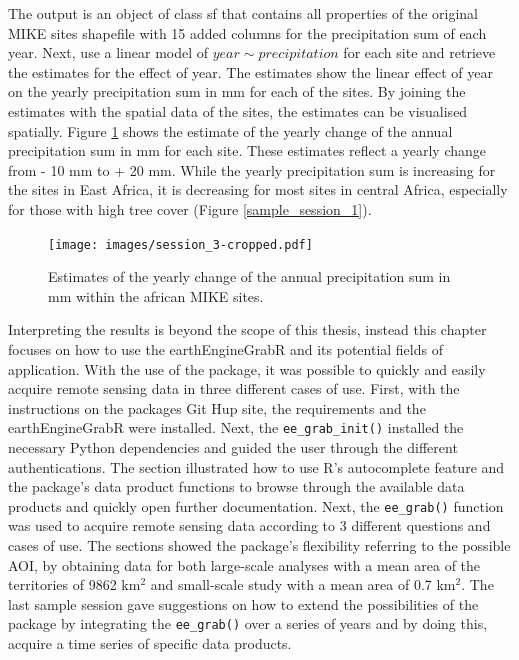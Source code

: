 The output is an object of class sf that contains all properties of the original MIKE sites shapefile with 15 added columns for the precipitation sum of each year.
Next, use a linear model of $year  \sim precipitation$ for each site and retrieve the estimates for the effect of year. 
The estimates show the linear effect of year on the yearly precipitation sum in mm for each of the sites. 
By joining the estimates with the spatial data of the sites, the estimates can be visualised spatially. 
Figure \ref{change} shows the estimate of the yearly change of the annual precipitation sum in mm for each site. These estimates reflect a yearly change from - 10 mm to + 20 mm. While the yearly precipitation sum is increasing for the sites in East Africa, it is decreasing for most sites in central Africa, especially for those with high tree cover (Figure \ref*{sample_session_1}).

\begin{center}
	\begin{figure}[h]
		\begin{center}
			\texttt{[image: images/session\_3-cropped.pdf]}
			\caption{Estimates of the yearly change of the annual precipitation sum in mm within the african MIKE sites.}
			\label{change}
		\end{center}
	\end{figure}
\end{center}



Interpreting the results is beyond the scope of this thesis, instead this chapter focuses on how to use the earthEngineGrabR and its potential fields of application.
With the use of the package, it was possible to quickly and easily acquire remote sensing data in three different cases of use. First, with the instructions on the packages Git Hup site, the requirements and the earthEngineGrabR were installed. Next, the \texttt{ee\_grab\_init()} installed the necessary Python dependencies and guided the user through the different authentications. The section illustrated how to use R's autocomplete feature and the package's data product functions to browse through the available data products and quickly open further documentation. Next, the \texttt{ee\_grab()} function was used to acquire remote sensing data according to 3 different questions and cases of use. The sections showed the package's flexibility referring to the possible AOI, by obtaining data for both large-scale analyses with a mean area of the territories of 9862 km$^2$ and small-scale study with a mean area of 0.7 km$^2$.
The last sample session gave suggestions on how to extend the possibilities of the package by integrating the \texttt{ee\_grab()} over a series of years and by doing this, acquire a time series of specific data products.




